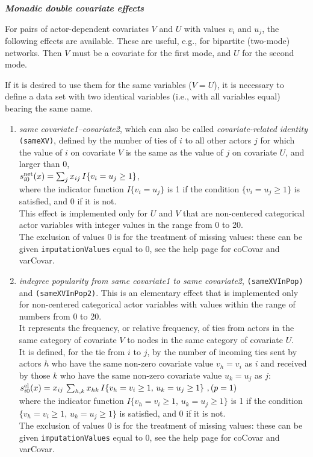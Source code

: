 \documentclass[a4paper,fleqn,11pt]{article}
\newcommand{\+}{\, + \,}
\newcommand{\sfn}[1]{\textsf{#1}}
\newcommand{\vit}{\theenumi}
\newcounter{savenumi}
\begin{document}
\noindent
\textbf{\emph{Monadic double covariate effects}}
\medskip


\noindent
For pairs of actor-dependent covariates $V$ and $U$ with values  $v_i$ and $u_j$,
the following effects are available.
These are useful, e.g., for bipartite (two-mode) networks.
 Then $V$ must be a covariate for the first mode, and $U$ for the second mode.

If it is desired to use them for the same variables ($V = U$),
it is necessary to define a data set with two identical variables
(i.e., with all variables equal) bearing the same name.

\begin{enumerate}
\setcounter{enumi}{\value{savenumi}}

 \item \emph{same covariate1--covariate2}, which can also be called {\em covariate-related identity}
 \texttt{(sameXV)},  defined by the
 number of ties of $i$ to all other actors $j$ for which the value of $i$
 on covariate $V$ is the same as the value of $j$ on covariate $U$,
 and larger than 0,\\[0.3em]
 $s^{\rm net}_{i\vit}(x) = \sum_j x_{ij}\, I\{v_i = u_j \geq 1\} $,\\[0.3em]
 where the indicator function $I\{v_i = u_j \} $ is 1 if the condition $\{v_i = u_j \geq 1\} $
 is satisfied, and 0 if it is not.\\
 This effect is implemented only for $U$ and $V$ that are non-centered categorical
  actor variables with integer values in the range from 0 to 20.\\
  The exclusion of values 0 is for the treatment of missing values:
  these can be given \texttt{imputationValues}  equal to 0,
  see the help page for \sfn{coCovar} and \sfn{varCovar}.

 \item \emph{indegree popularity from same covariate1 to same covariate2},
 \texttt{(sameXVInPop)} and \texttt{(sameXVInPop2)}.
  This is an elementary effect that is implemented only for non-centered categorical
  actor variables with values within the range of numbers from 0 to 20.\\
  It represents the frequency, or relative frequency, of ties from actors in the
  same category of covariate $V$ to nodes in the same category of covariate $U$.\\
 It is defined, for the tie from $i$ to $j$, by the number of
incoming ties sent by actors $h$ who have the same non-zero covariate value $v_h = v_i$ as $i$
 and received by those $k$ who have the same non-zero covariate value $u_k = u_j$ as $j$:\\[0.3em]
 $s^{\rm el}_{i\vit}(x) =  x_{ij}\, \sum_{h,k} x_{hk}\, I\{v_h = v_i \geq 1,\, u_k=u_j \geq 1\}  \ ,
             \hfill (p=1) $\\[0.3em]
 where the indicator function $ I\{v_h = v_i\geq 1,\, u_k=u_j \geq 1 \} $ is 1
 if the condition $\{v_h = v_i \geq 1,\, u_k=u_j \geq 1 \} $ is satisfied, and 0 if it is not.\\
  The exclusion of values 0 is for the treatment of missing values:
  these can be given \texttt{imputationValues}  equal to 0,
  see the help page for \sfn{coCovar} and \sfn{varCovar}.


\end{enumerate}
\end{document}
